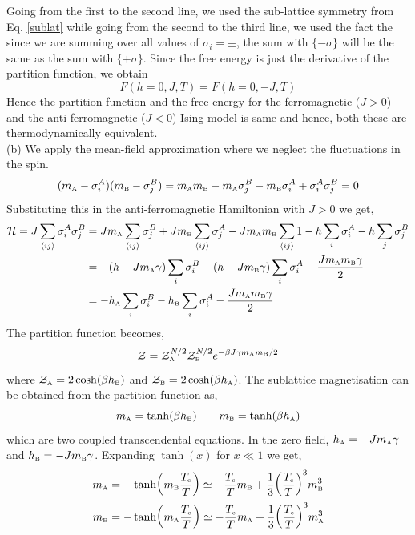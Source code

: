 Going from the first to the second line, we used the sub-lattice symmetry from Eq. \eqref{sublat} while going from the second to the third line, we used the fact the since we are summing over all values of $\sigma_i = \pm$, the sum with $\{ -\sigma\}$ will be the same as the sum with $\{ +\sigma\}$. Since the free energy is just the derivative of the partition function, we obtain 
\begin{equation}
    F(h=0, J, T) = F(h=0, -J, T)
\end{equation}
Hence the partition function and the free energy for the ferromagnetic ($J>0$) and the anti-ferromagnetic ($J<0$) Ising model is same and hence, both these are thermodynamically equivalent.\\[0.3cm]
(b) We apply the mean-field approximation where we neglect the fluctuations in the spin.
\begin{equation}
    (m_{\text{\tiny A}} - \sigma^A_i) (m_{\text{\tiny B}} - \sigma^B_j) = m_{\text{\tiny A}}m_{\text{\tiny B}} -m_{\text{\tiny A}}\sigma_j^B - m_{\text{\tiny B}}\sigma_i^A + \sigma_i^A \sigma_j^B = 0
\end{equation}
Substituting this in the anti-ferromagnetic Hamiltonian with $J>0$ we get,
\begin{align*}
    \mathcal H = J \sum\limits_{\left\langle ij \right\rangle} \sigma_i^A \sigma_j^B &= Jm_{\text{\tiny A}} \sum\limits_{\left\langle ij \right\rangle}\sigma_j^B + Jm_{\text{\tiny B}} \sum\limits_{\left\langle ij \right\rangle}\sigma_j^A -J m_{\text{\tiny A}}m_{\text{\tiny B}}\sum\limits_{\left\langle ij \right\rangle} 1 -h \sum_{i}\sigma_i^A -h\sum_{j}\sigma_j^B\\
    &=-(h-Jm_{\text{\tiny A}}\gamma)\sum\limits_i \sigma_i^B -(h-Jm_{\text{\tiny B}}\gamma)\sum\limits_i \sigma_i^A - \frac{Jm_{\text{\tiny A}}m_{\text{\tiny B}}\gamma}{2}\\
    &= -h_{\text{\tiny A}}\sum\limits_i \sigma_i^B -h_{\text{\tiny B}}\sum\limits_i \sigma_i^A -  \frac{Jm_{\text{\tiny A}}m_{\text{\tiny B}}\gamma}{2}
\end{align*}
The partition function becomes, 
$$\mathcal Z = \mathcal Z_{\text{\tiny A}}^{N/2} \mathcal Z_{\text{\tiny B}}^{N/2} e^{-\beta J \gamma m_{\text{\tiny A}}m_{\text{\tiny B}}/2 }$$
where $\mathcal Z_{\text{\tiny A}} = 2\cosh(\beta h_{\text{\tiny B}})$ and $\mathcal Z_{\text{\tiny B}} = 2\cosh(\beta h_{\text{\tiny A}})$. The sublattice magnetisation can be obtained from the partition function as,
\begin{equation}
    m_{\text{\tiny A}} = \tanh(\beta h_{\text{\tiny B}}) \qquad m_{\text{\tiny B}} = \tanh(\beta h_{\text{\tiny A}})
\end{equation}
which are two coupled transcendental equations. In the zero field, $h_{\text{\tiny A}} = -Jm_{\text{\tiny A}}\gamma$ and $h_{\text{\tiny B}} = -Jm_{\text{\tiny B}}\gamma$. Expanding $\tanh(x)$ for $x\ll 1$ we get, 
\begin{align}\label{magg}
    \begin{split}
         m_{\text{\tiny A}} &= - \tanh(m_{\text{\tiny B}} \frac{T_{\text{\tiny c}}}{T}) \simeq -\frac{T_{\text{\tiny c}}}{T}m_{\text{\tiny B}}  +\frac{1}{3}\qty(\frac{T_{\text{\tiny c}}}{T})^3 m_{\text{\tiny B}}^3\\
     m_{\text{\tiny B}} &= - \tanh(m_{\text{\tiny A}} \frac{T_{\text{\tiny c}}}{T}) \simeq -\frac{T_{\text{\tiny c}}}{T}m_{\text{\tiny A}}  +\frac{1}{3}\qty(\frac{T_{\text{\tiny c}}}{T})^3 m_{\text{\tiny A}}^3
    \end{split}
\end{align}
